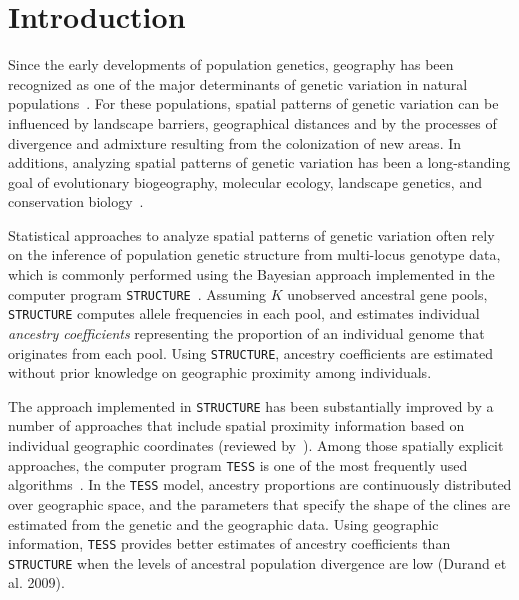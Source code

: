 
     
  \section{Introduction}


Since the early developments of population genetics, geography has been recognized as one of the major determinants of genetic variation in natural populations~\citep{wright1943isolation,malecot1948mathematics,kimura1964stepping,cavalli1994history,
epperson2003geographical}. For these populations, spatial patterns of genetic variation can be influenced by landscape barriers, geographical distances and by the processes of divergence and admixture resulting from the colonization of new areas. In additions, analyzing spatial patterns of genetic variation has been a long-standing goal of evolutionary biogeography, molecular ecology, landscape genetics, and conservation biology~\citep{segelbacher2010applications,manel2010perspectives}.


Statistical approaches to analyze spatial patterns of genetic variation often rely on the inference of population genetic structure from multi-locus genotype data, which is commonly performed using the Bayesian approach implemented in the computer program {\tt STRUCTURE}~\citep{pritchard2000inference}.  Assuming $K$ unobserved ancestral gene pools, {\tt STRUCTURE} computes allele frequencies in each pool, and estimates individual {\it ancestry coefficients} representing the proportion of an individual genome that originates from each pool. Using {\tt STRUCTURE}, ancestry coefficients are estimated without prior knowledge on geographic proximity among individuals. 

The approach implemented in {\tt STRUCTURE} has been substantially improved by a number of approaches that include spatial proximity information based on individual geographic coordinates (reviewed by~\cite{franccois2010spatially}). Among those spatially explicit approaches, the computer program {\tt TESS} is one of the most frequently used algorithms~\citep{chen2007bayesian,franccois2006bayesian}. In the {\tt TESS} model, ancestry proportions are continuously distributed over geographic space, and the parameters that specify the shape of the clines are estimated from the genetic and the geographic data. Using geographic information, {\tt TESS} provides better estimates of ancestry coefficients than {\tt STRUCTURE} when the levels of ancestral population divergence are low (Durand et al. 2009).  

